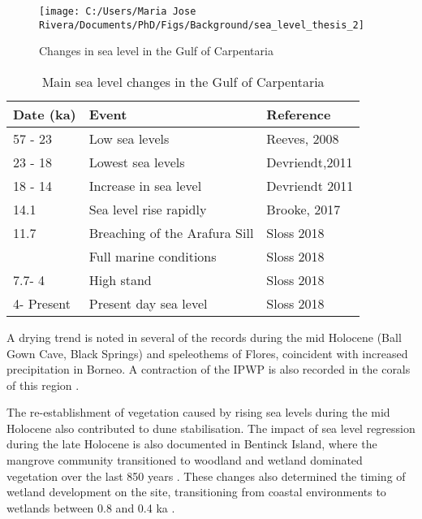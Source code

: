 \documentclass[
  12pt,
]{book}
\begin{document}
\begin{figure}

{\centering \texttt{[image: C:/Users/Maria Jose Rivera/Documents/PhD/Figs/Background/sea\_level\_thesis\_2]} 

}

\caption{Changes in sea level in the Gulf of Carpentaria}\label{fig:fig-sea}
\end{figure}



\begin{table}

\caption{\label{tab:gc}Main sea level changes in the Gulf of Carpentaria}
\centering
\begin{tabular}[t]{lll}
\toprule
Date (ka) & Event & Reference\\
\midrule
57 - 23 & Low sea levels & Reeves, 2008\\
23 - 18 & Lowest sea levels & Devriendt,2011\\
18 - 14 & Increase in sea level & Devriendt 2011\\
14.1 & Sea level rise rapidly & Brooke, 2017\\
11.7 & Breaching of the Arafura Sill & Sloss 2018\\
\addlinespace
10.5 & Full marine conditions & Sloss 2018\\
7.7- 4 & High stand & Sloss 2018\\
4- Present & Present day sea level & Sloss 2018\\
\bottomrule
\end{tabular}
\end{table}



A drying trend is noted in several of the records during the mid Holocene (Ball Gown Cave, Black Springs) and speleothems of Flores, coincident with increased precipitation in Borneo. A contraction of the IPWP is also recorded in the corals of this region \citep{reevesPalaeoenvironmentalChangeTropical2013}.

The re-establishment of vegetation caused by rising sea levels during the mid Holocene also contributed to dune stabilisation. The impact of sea level regression during the late Holocene is also documented in Bentinck Island, where the mangrove community transitioned to woodland and wetland dominated vegetation over the last 850 years \citep{mackenzieLateHoloceneRecordCoastal2020}. These changes also determined the timing of wetland development on the site, transitioning from coastal environments to wetlands between 0.8 and 0.4 ka \citep{mackenzieGeochemicalInvestigationSouth2017}.
\end{document}
